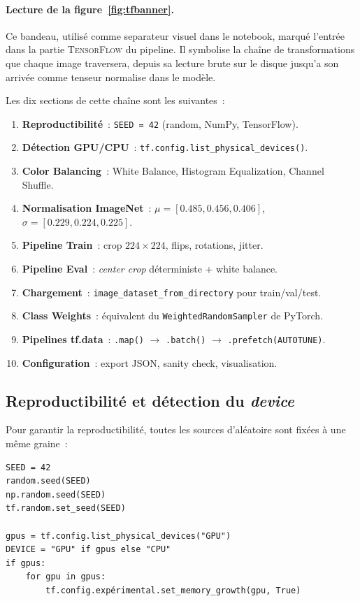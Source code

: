 \documentclass[12pt,a4paper,openany]{report}
\begin{document}
\paragraph{Lecture de la figure~\ref{fig:tfbanner}.}
Ce bandeau, utilisé comme separateur visuel dans le notebook, marqué l'entrée dans la partie \textsc{TensorFlow} du pipeline. Il symbolise la chaîne de transformations que chaque image traversera, depuis sa lecture brute sur le disque jusqu'a son arrivée comme tenseur normalise dans le modèle.

Les dix sections de cette chaîne sont les suivantes~:
\begin{enumerate}
    \item \textbf{Reproductibilité}~: \texttt{SEED = 42} (random, NumPy, TensorFlow).
    \item \textbf{Détection GPU/CPU}~: \texttt{tf.config.list\_physical\_devices()}.
    \item \textbf{Color Balancing}~: White Balance, Histogram Equalization, Channel Shuffle.
    \item \textbf{Normalisation ImageNet}~: $\mu = [0.485,0.456,0.406]$, $\sigma=[0.229,0.224,0.225]$.
    \item \textbf{Pipeline Train}~: crop $224\times224$, flips, rotations, jitter.
    \item \textbf{Pipeline Eval}~: \emph{center crop} déterministe + white balance.
    \item \textbf{Chargement}~: \texttt{image\_dataset\_from\_directory} pour train/val/test.
    \item \textbf{Class Weights}~: équivalent du \texttt{WeightedRandomSampler} de PyTorch.
    \item \textbf{Pipelines tf.data}~: \texttt{.map()} $\to$ \texttt{.batch()} $\to$ \texttt{.prefetch(AUTOTUNE)}.
    \item \textbf{Configuration}~: export JSON, sanity check, visualisation.
\end{enumerate}

\subsection{Reproductibilité et détection du \emph{device}}

Pour garantir la reproductibilité, toutes les sources d'aléatoire sont fixées à une même graine~:

\begin{lstlisting}[caption={Initialisation reproductible et détection automatique du device.}]
SEED = 42
random.seed(SEED)
np.random.seed(SEED)
tf.random.set_seed(SEED)

gpus = tf.config.list_physical_devices("GPU")
DEVICE = "GPU" if gpus else "CPU"
if gpus:
    for gpu in gpus:
        tf.config.expérimental.set_memory_growth(gpu, True)
\end{lstlisting}
\end{document}
